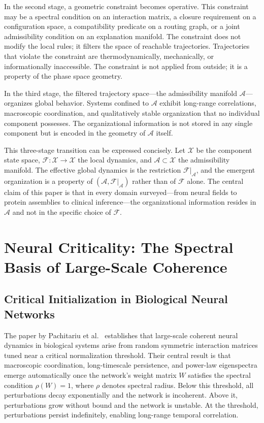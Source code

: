 \documentclass[11pt, oneside]{article}
\numberwithin{equation}{section}
\theoremstyle{rsvpstyle}
\theoremstyle{remark}
\newcommand{\Adm}{\mathcal{A}}
\begin{document}
In the second stage, a geometric constraint becomes operative. This constraint may be
a spectral condition on an interaction matrix, a closure requirement on a configuration
space, a compatibility predicate on a routing graph, or a joint admissibility condition
on an explanation manifold. The constraint does not modify the local rules; it filters
the space of reachable trajectories. Trajectories that violate the constraint are
thermodynamically, mechanically, or informationally inaccessible. The constraint is
not applied from outside; it is a property of the phase space geometry.

In the third stage, the filtered trajectory space---the admissibility manifold
$\Adm$---organizes global behavior. Systems confined to $\Adm$ exhibit long-range
correlations, macroscopic coordination, and qualitatively stable organization that
no individual component possesses. The organizational information is not stored in
any single component but is encoded in the geometry of $\Adm$ itself.

This three-stage transition can be expressed concisely. Let $\mathcal{X}$ be the
component state space, $\mathcal{F} : \mathcal{X} \to \mathcal{X}$ the local dynamics,
and $\Adm \subset \mathcal{X}$ the admissibility manifold. The effective global
dynamics is the restriction $\mathcal{F}|_{\Adm}$, and the emergent organization is
a property of $(\Adm, \mathcal{F}|_{\Adm})$ rather than of $\mathcal{F}$ alone.
The central claim of this paper is that in every domain surveyed---from
neural fields to protein assemblies to clinical inference---the organizational
information resides in $\Adm$ and not in the specific choice of $\mathcal{F}$.

\section{Neural Criticality: The Spectral Basis of Large-Scale Coherence}
\label{sec:neural}

\subsection{Critical Initialization in Biological Neural Networks}

The paper by Pachitariu et al.~\cite{Pachitariu2026Critical} establishes that large-scale
coherent neural dynamics in biological systems arise from random symmetric interaction
matrices tuned near a critical normalization threshold. Their central result is that
macroscopic coordination, long-timescale persistence, and power-law eigenspectra emerge
automatically once the network's weight matrix $W$ satisfies the spectral condition
$\rho(W) = 1$, where $\rho$ denotes spectral radius. Below this threshold, all
perturbations decay exponentially and the network is incoherent. Above it, perturbations
grow without bound and the network is unstable. At the threshold, perturbations persist
indefinitely, enabling long-range temporal correlation.
\end{document}
